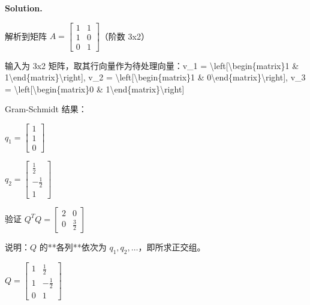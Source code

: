 \documentclass[12pt, a4paper]{article}
\newcommand{\solution}{%
  \par\noindent
  {\color{solutiongreen}\bfseries Solution.}\par
}
\begin{document}
\solution

\begin{stepbox}
解析到矩阵 $A = \left[\begin{matrix}1 & 1\\1 & 0\\0 & 1\end{matrix}\right]$（阶数 3x2）
\end{stepbox}

\begin{stepbox}
输入为 3x2 矩阵，取其行向量作为待处理向量：v\_1 = \textbackslash{}left[\textbackslash{}begin\{matrix\}1 \& 1\textbackslash{}end\{matrix\}\textbackslash{}right], v\_2 = \textbackslash{}left[\textbackslash{}begin\{matrix\}1 \& 0\textbackslash{}end\{matrix\}\textbackslash{}right], v\_3 = \textbackslash{}left[\textbackslash{}begin\{matrix\}0 \& 1\textbackslash{}end\{matrix\}\textbackslash{}right]
\end{stepbox}

\begin{stepbox}
Gram-Schmidt 结果：
\end{stepbox}

\begin{stepbox}
$q_1 = \left[\begin{matrix}1\\1\\0\end{matrix}\right]$
\end{stepbox}

\begin{stepbox}
$q_2 = \left[\begin{matrix}\frac{1}{2}\\- \frac{1}{2}\\1\end{matrix}\right]$
\end{stepbox}

\begin{stepbox}
验证 $Q^TQ = \left[\begin{matrix}2 & 0\\0 & \frac{3}{2}\end{matrix}\right]$
\end{stepbox}

\begin{stepbox}
说明：$Q$ 的**各列**依次为 $q_1, q_2, \dots$，即所求正交组。
\end{stepbox}

\begin{center}
$\boxed{Q = \left[\begin{matrix}1 & \frac{1}{2}\\1 & - \frac{1}{2}\\0 & 1\end{matrix}\right]}$
\end{center}
\end{document}
